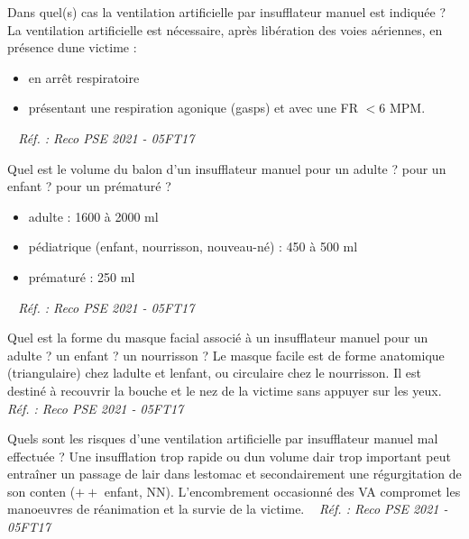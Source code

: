 \documentclass[grid,avery5371,landscape]{flashcards}
\makeatletter
\newcounter{nocarte}
\newcommand{\categ}[1]{%
  \def\@categ{#1}%
  \setcounter{nocarte}{0}%
}
\newcommand{\source}[1]{%
  \medskip
  \itshape%
   ~ \hfill Réf. : #1}
\makeatother
\begin{document}
\color[HTML]{003273}
\categ{PSE}
\begin{flashcard}[CAT]{
 Dans quel(s) cas la ventilation artificielle par insufflateur manuel est indiquée ?   }
  La ventilation artificielle est nécessaire, après libération des voies aériennes, en présence dune victime :
\begin{itemize}
\item en arrêt respiratoire 
\item présentant une respiration agonique (gasps) et avec une FR $< 6$ MPM.
\end{itemize}
  \source{Reco PSE 2021 - 05FT17}
\end{flashcard}


\color[HTML]{003273}
\categ{PSE}
\begin{flashcard}[matériel]{
 Quel est le volume du balon d'un insufflateur manuel pour un adulte ? pour un enfant ? pour un prématuré ?   }
  \begin{itemize}
\item adulte : 1600 à 2000 ml
\item pédiatrique (enfant, nourrisson, nouveau-né) : 450 à 500 ml
\item prématuré : 250 ml
\end{itemize}
  \source{Reco PSE 2021 - 05FT17}
\end{flashcard}


\color[HTML]{003273}
\categ{PSE}
\begin{flashcard}[matériel]{
 Quel est la forme du masque facial associé à un insufflateur manuel pour un adulte ? un enfant ? un nourrisson ?   }
  Le masque facile est de forme anatomique (triangulaire) chez ladulte et lenfant, ou circulaire chez le nourrisson. Il est destiné à recouvrir la bouche et le nez de la victime sans appuyer sur les yeux. 
  \source{Reco PSE 2021 - 05FT17}
\end{flashcard}


\color[HTML]{003273}
\categ{PSE}
\begin{flashcard}[CAT]{
 Quels sont les risques d'une ventilation artificielle par insufflateur manuel mal effectuée ?   }
  Une insufflation trop rapide ou dun volume dair trop important peut entraîner un passage de lair dans lestomac et secondairement une régurgitation de son conten ($++$ enfant, NN). L'encombrement occasionné des VA compromet les manoeuvres de réanimation et la survie de la victime.
  \source{Reco PSE 2021 - 05FT17}
\end{flashcard}
\end{document}
